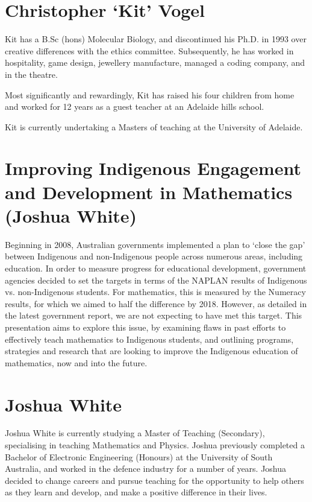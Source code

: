 \documentclass[twoside,14pt,a4paper,notitlepage]{memoir}
\begin{document}
\section*{Christopher `Kit' Vogel}

Kit has a B.Sc (hons) Molecular Biology, and discontinued his Ph.D. in 1993 over creative differences with the ethics committee. Subsequently, he has worked in hospitality, game design, jewellery manufacture, managed a coding company, and in the theatre.

Most significantly and rewardingly, Kit has raised his four children from home and worked for 12 years as a guest teacher at an Adelaide hills school.

Kit is currently undertaking a Masters of teaching at the University of Adelaide.



\section*{Improving Indigenous Engagement and Development in Mathematics (Joshua White)}
\label{aut:white}

Beginning in 2008, Australian governments implemented a plan to ‘close the gap’ between Indigenous and non-Indigenous people across numerous areas, including education. In order to measure progress for educational development, government agencies decided to set the targets in terms of the NAPLAN results of Indigenous vs. non-Indigenous students. For mathematics, this is measured by the Numeracy results, for which we aimed to half the difference by 2018. However, as detailed in the latest government report, we are not expecting to have met this target.
This presentation aims to explore this issue, by examining flaws in past efforts to effectively teach mathematics to Indigenous students, and outlining programs, strategies and research that are looking to improve the Indigenous education of mathematics, now and into the future.

\section*{Joshua White}

Joshua White is currently studying a Master of Teaching (Secondary), specialising in teaching Mathematics and Physics. Joshua previously completed a Bachelor of Electronic Engineering (Honours) at the University of South Australia, and worked in the defence industry for a number of years. Joshua decided to change careers and pursue teaching for the opportunity to help others as they learn and develop, and make a positive difference in their lives.
\end{document}
